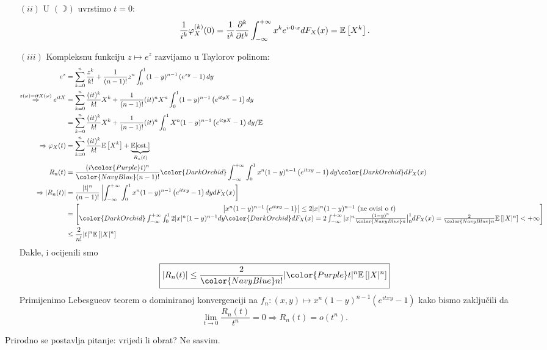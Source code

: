 \documentclass{article}
\begin{document}
\begin{enumerate}
    \item[\((ii)\)] U \((\rightmoon)\) uvrstimo \(t=0\): \[\frac1{i^k}\varphi_X^{(k)}(0)=\frac1{i^k}\frac{\partial^k}{\partial t^k}\int_{-\infty}^{+\infty}x^ke^{i\cdot0\cdot x}dF_X(x)=\Bbb E\left[X^k\right].\] 
    \item[\((iii)\)] Kompleksnu funkciju \(z\mapsto e^z\) razvijamo u Taylorov polinom: \[\begin{aligned}e^z&=\sum_{k=0}^n\frac{z^k}{k!}+\frac1{(n-1)!}z^n\int_0^1(1-y)^{n-1}\left(e^{zy}-1\right)dy\\\overset{z(\omega)=itX(\omega)}{\Rightarrow}e^{itX}&=\sum_{k=0}^n\frac{(it)^k}{k!}X^k+\frac1{(n-1)!}(it)^nX^n\int_0^1(1-y)^{n-1}\left(e^{ityX}-1\right)dy\\&=\sum_{k=0}^n\frac{(it)^k}{k!}X^k+\frac1{(n-1)!}(it)^n\int_0^1X^n(1-y)^{n-1}\left(e^{ityX}-1\right)dy/\Bbb E\\\Rightarrow\varphi_X(t)&=\sum_{k=0}^n\frac{(it)^k}{k!}\Bbb E\left[X^k\right]+\underbrace{\Bbb E[\text{ost.}]}_{R_n(t)}\\R_n(t)&=\frac{(i{\color{Purple}t})^n}{\color{NavyBlue}(n-1)!}{\color{DarkOrchid}\int_{-\infty}^{+\infty}}\int_0^1x^n(1-y)^{n-1}\left(e^{itxy}-1\right)dy{\color{DarkOrchid}dF_X(x)}\\\Rightarrow|R_n(t)|&=\frac{|t|^n}{(n-1)!}\left|\int_{-\infty}^{+\infty}\int_0^1x^n(1-y)^{n-1}\left(e^{itxy}-1\right)dydF_X(x)\right]\\&=\begin{bmatrix}\left|x^n(1-y)^{n-1}\left(e^{itxy}-1\right)\right|\le2|x|^n(1-y)^{n-1}\text{ (ne ovisi o }t\text{)}\\{\color{DarkOrchid}\int_{-\infty}^{+\infty}}\int_0^12|x|^n(1-y)^{n-1}dy{\color{DarkOrchid}dF_X(x)}=2\int_{-\infty}^{+\infty}|x|^n\frac{(1-y)^n}{\color{NavyBlue}n}\big|_0^1dF_X(x)=\frac2{\color{NavyBlue}n}\Bbb E\left[|X|^n\right]<+\infty\end{bmatrix}\\&\le\frac2{n!}|t|^n\Bbb E\left[|X|^n\right]\end{aligned}\] Dakle, i ocijenili smo \[\boxed{\left|R_n(t)\right|\le\frac2{\color{NavyBlue}n!}|{\color{Purple}t}|^n\Bbb E\left[|X|^n\right]}\] Primijenimo Lebesgueov teorem o dominiranoj konvergenciji na \(f_n:(x,y)\mapsto x^n(1-y)^{n-1}\left(e^{itxy}-1\right)\) kako bismo zaključili da \[\lim_{t\to 0}\frac{R_n(t)}{t^n}=0\Rightarrow R_n(t)=o\left(t^n\right).\]
\end{enumerate}
\newpage
Prirodno se postavlja pitanje: vrijedi li obrat? Ne sasvim.\newline\newline
\end{document}

